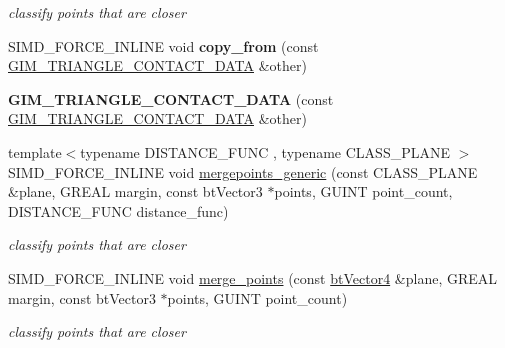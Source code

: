 \begin{DoxyCompactItemize}
\begin{DoxyCompactList}\small\item\em classify points that are closer \end{DoxyCompactList}\item 
\mbox{\label{structGIM__TRIANGLE__CONTACT__DATA_a1ee8cd81406ddf9e64f725f97d172db0}} 
S\+I\+M\+D\+\_\+\+F\+O\+R\+C\+E\+\_\+\+I\+N\+L\+I\+NE void {\bfseries copy\+\_\+from} (const \hyperlink{structGIM__TRIANGLE__CONTACT__DATA}{G\+I\+M\+\_\+\+T\+R\+I\+A\+N\+G\+L\+E\+\_\+\+C\+O\+N\+T\+A\+C\+T\+\_\+\+D\+A\+TA} \&other)
\item 
\mbox{\label{structGIM__TRIANGLE__CONTACT__DATA_a99ff857d8f9f1e8cdd34875a50fe3caf}} 
{\bfseries G\+I\+M\+\_\+\+T\+R\+I\+A\+N\+G\+L\+E\+\_\+\+C\+O\+N\+T\+A\+C\+T\+\_\+\+D\+A\+TA} (const \hyperlink{structGIM__TRIANGLE__CONTACT__DATA}{G\+I\+M\+\_\+\+T\+R\+I\+A\+N\+G\+L\+E\+\_\+\+C\+O\+N\+T\+A\+C\+T\+\_\+\+D\+A\+TA} \&other)
\item 
\mbox{\label{structGIM__TRIANGLE__CONTACT__DATA_a159d51dfe240909dda5436304a655500}} 
{\footnotesize template$<$typename D\+I\+S\+T\+A\+N\+C\+E\+\_\+\+F\+U\+NC , typename C\+L\+A\+S\+S\+\_\+\+P\+L\+A\+NE $>$ }\\S\+I\+M\+D\+\_\+\+F\+O\+R\+C\+E\+\_\+\+I\+N\+L\+I\+NE void \hyperlink{structGIM__TRIANGLE__CONTACT__DATA_a159d51dfe240909dda5436304a655500}{mergepoints\+\_\+generic} (const C\+L\+A\+S\+S\+\_\+\+P\+L\+A\+NE \&plane, G\+R\+E\+AL margin, const bt\+Vector3 $\ast$points, G\+U\+I\+NT point\+\_\+count, D\+I\+S\+T\+A\+N\+C\+E\+\_\+\+F\+U\+NC distance\+\_\+func)
\begin{DoxyCompactList}\small\item\em classify points that are closer \end{DoxyCompactList}\item 
\mbox{\label{structGIM__TRIANGLE__CONTACT__DATA_a4d3e25d735f8e5111bb54dd764cbb041}} 
S\+I\+M\+D\+\_\+\+F\+O\+R\+C\+E\+\_\+\+I\+N\+L\+I\+NE void \hyperlink{structGIM__TRIANGLE__CONTACT__DATA_a4d3e25d735f8e5111bb54dd764cbb041}{merge\+\_\+points} (const \hyperlink{classbtVector4}{bt\+Vector4} \&plane, G\+R\+E\+AL margin, const bt\+Vector3 $\ast$points, G\+U\+I\+NT point\+\_\+count)
\begin{DoxyCompactList}\small\item\em classify points that are closer \end{DoxyCompactList}\end{DoxyCompactItemize}
